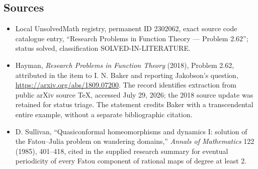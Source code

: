 \documentclass[11pt]{article}
\begin{document}
\subsection{Sources}
\begin{itemize}
\item Local UnsolvedMath registry, permanent ID 2302062, exact source code catalogue entry, ``Research Problems in Function Theory --- Problem 2.62''; status solved, classification SOLVED-IN-LITERATURE.
\item Hayman, \emph{Research Problems in Function Theory} (2018), Problem 2.62, attributed in the item to I. N. Baker and reporting Jakobson's question, \url{https://arxiv.org/abs/1809.07200}. The record identifies extraction from public arXiv source TeX, accessed July 29, 2026; the 2018 source update was retained for status triage. The statement credits Baker with a transcendental entire example, without a separate bibliographic citation.
\item D. Sullivan, ``Quasiconformal homeomorphisms and dynamics I: solution of the Fatou--Julia problem on wandering domains,'' \emph{Annals of Mathematics} 122 (1985), 401--418, cited in the supplied research summary for eventual periodicity of every Fatou component of rational maps of degree at least $2$.
\end{itemize}
\end{document}
